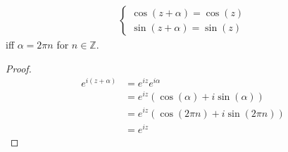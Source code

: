 \begin{lemma}
    \begin{align}
        \begin{cases}
            \cos(z + \alpha) = \cos(z) \\
            \sin(z + \alpha) = \sin(z)
        \end{cases}
    \end{align}
    iff $\alpha = 2\pi n$ for $n \in \mathbb{Z}$.
\end{lemma}

\begin{proof}
    \begin{align}
        e^{i(z + \alpha)} & = e^{iz} e^{i\alpha}                                   \\
                          & = e^{iz} \left( \cos(\alpha) + i \sin(\alpha) \right)  \\
                          & = e^{iz} \left( \cos(2\pi n) + i \sin(2 \pi n) \right) \\
                          & = e^{iz}
    \end{align}
\end{proof}